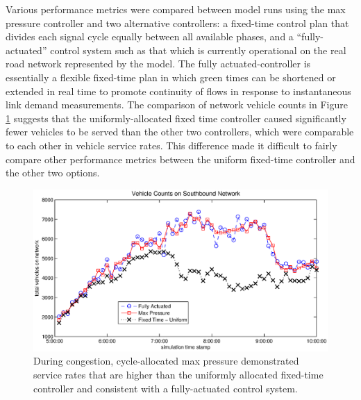 Various performance metrics were compared between model runs using the max pressure controller and two alternative controllers: a fixed-time control plan that divides each signal cycle equally between all available phases, and a ``fully-actuated'' control system such as that which is currently operational on the real road network represented by the model. The fully actuated-controller is essentially a flexible fixed-time plan in which green times can be shortened or extended in real time to promote continuity of flows in response to instantaneous link demand measurements. 
The comparison of network vehicle counts in Figure \ref{fig_counts} suggests that the uniformly-allocated fixed time controller caused significantly fewer vehicles to be served than the other two controllers, which were comparable to each other in vehicle service rates. This difference made it difficult to fairly compare other performance metrics between the uniform fixed-time controller and the other two options. 
\begin{figure}[h!]
\centering
\includegraphics[width=\columnwidth]{./VehicleCountsPlot.eps}
\vspace{-2em}
\caption{During congestion, cycle-allocated max pressure demonstrated service rates that are higher than the uniformly allocated fixed-time controller and consistent with a fully-actuated control system.  \label{fig_counts}}
\end{figure}
